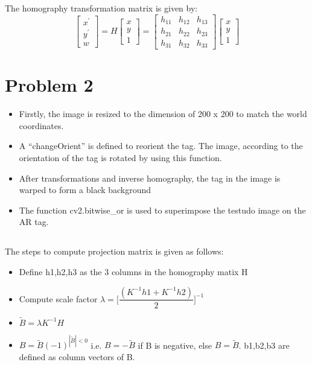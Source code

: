 \documentclass[a4paper, 10pt]{article}
\begin{document}
\begin{multicols}{2}
		The homography transformation matrix is given by:
		\[
		\begin{bmatrix}
		x^{'} \\
		y^{'} \\
		w
		\end{bmatrix} =
		H\begin{bmatrix}
		x \\
		y \\
		1
		\end{bmatrix} = 
		\begin{bmatrix}
		h_{11} & h_{12} & h_{13}\\
		h_{21} & h_{22} & h_{23}\\
		h_{31} & h_{32} & h_{33}
		\end{bmatrix}
		\begin{bmatrix}
		x \\
		y \\
		1
		\end{bmatrix}
		\]
		
		\section{Problem 2}
		
	
		
		\begin{itemize}
		\item Firstly, the image is resized to the dimension of 200 x 200 to match the world coordinates.
		\item A “changeOrient” is defined to reorient the tag. The image, according to the orientation of the tag is rotated by using this function.
		\item After transformations and inverse homography, the tag in the image is warped to form a black background
		\item The function cv2.bitwise\_or is used to superimpose the testudo image on the AR tag.
		\end{itemize}
	

		
		\subsection{}		
		
		The steps to compute projection matrix is given as follows:
		\begin{itemize}
			\item Define h1,h2,h3 as the 3 columns in the homography
			matix H
			\item Compute scale factor $\lambda = \Big[ \dfrac{(K^{-1}h1 + K^{-1}h2)}{2}\Big]^{-1}$
			\item $\tilde{B} = \lambda K^{-1}H$ 
			\item $B = \tilde{B}(-1)^{|\tilde{B}|<0}$ i.e. $B = -\tilde{B}$ if B is negative, else $B = \tilde{B}$. b1,b2,b3 are defined as column vectors of B.
		\end{itemize}
		

		
	\end{multicols}
	
\end{document}
